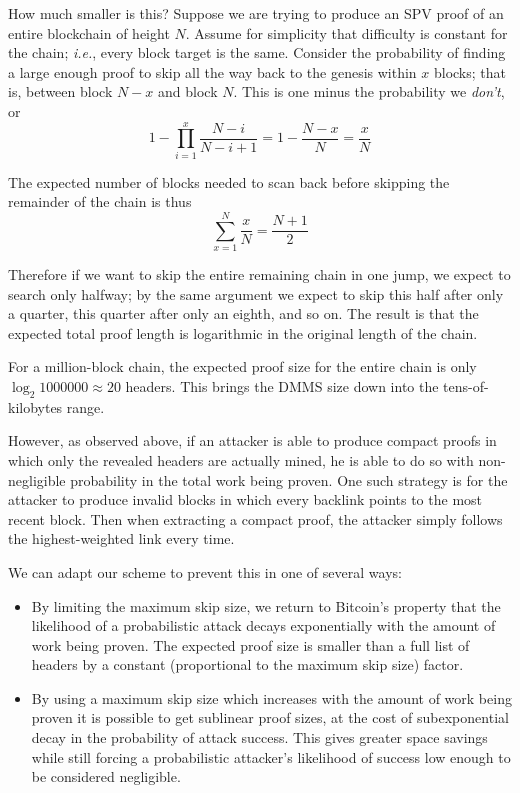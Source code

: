 \documentclass[letterpaper]{article}
\newcommand{\hashsig}{DMMS\xspace}
\begin{document}
\begin{appendices}
How much smaller is this? Suppose we are trying to produce an SPV proof of
an entire blockchain of height $N$. Assume for simplicity that difficulty
is constant for the chain; \emph{i.e.}, every block target is the same.
Consider the probability of finding a large enough proof to skip all the
way back to the genesis within $x$ blocks; that is, between block $N - x$
and block $N$. This is one minus the probability we \emph{don't}, or
\[ 1 - \prod_{i=1}^x \frac{N - i}{N - i + 1} = 1 - \frac{N - x}{N}  = \frac{x}{N}\]

The expected number of blocks needed to scan back before skipping the
remainder of the chain is thus
\[ \sum_{x = 1}^N \frac{x}N = \frac{N + 1}2 \]

Therefore if we want to skip the entire remaining chain in one jump, we expect
to search only halfway; by the same argument we expect to skip this half after
only a quarter, this quarter after only an eighth, and so on. The result is
that the expected total proof length is logarithmic in the original length of
the chain.

For a million-block chain, the expected proof size for the entire chain is
only $\log_2 1000000 \approx 20$ headers. This brings the \hashsig size down into the tens-of-kilobytes
range.


However, as observed above, if an attacker is able to produce compact proofs in
which only the revealed headers are actually mined, he is able to do so with
non-negligible probability in the total work being proven. One such strategy
is for the attacker to produce invalid blocks in which every backlink
points to the most recent block. Then when extracting a compact proof, the
attacker simply follows the highest-weighted link every time.

We can adapt our scheme to prevent this in one of several ways:

\begin{itemize}
\item By limiting the maximum skip size, we return to Bitcoin's property that
the likelihood of a probabilistic attack decays exponentially with the amount
of work being proven. The expected proof size is smaller than a full list of
headers by a constant (proportional to the maximum skip size) factor.

\item By using a maximum skip size which increases with the amount of work
being proven it is possible to get sublinear proof sizes, at the cost of
subexponential decay in the probability of attack success. This gives greater
space savings while still forcing a probabilistic attacker's likelihood of
success low enough to be considered negligible.


\end{itemize}
\end{appendices}
\end{document}
